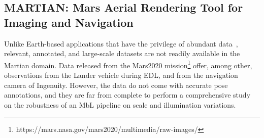 \subsection{MARTIAN: Mars Aerial Rendering Tool for Imaging and Navigation}
\label{subsec:martian}
Unlike Earth-based applications that have the privilege of abundant data~\cite{zhu2023sues,zheng2020university}, relevant, annotated, and large-scale datasets are not readily available in the Martian domain. Data released from the Mars2020 mission\footnote{https://mars.nasa.gov/mars2020/multimedia/raw-images/} offer, among other, observations from the Lander vehicle during EDL, and from the navigation camera of Ingenuity. However, the data do not come with accurate pose annotations, and they are far from complete to perform a comprehensive study on the robustness of an MbL pipeline on scale and illumination variations.

